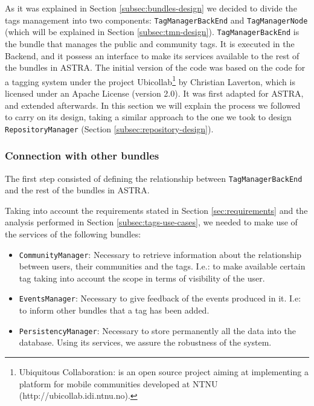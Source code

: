 As it was explained in Section \ref{subsec:bundles-design} we decided to divide
the tags management into two components: \verb|TagManagerBackEnd| and
\verb|TagManagerNode| (which will be explained in Section
\ref{subsec:tmn-design}).
\newline
\verb|TagManagerBackEnd| is the bundle that manages the public and community
tags. It is executed in the Backend, and it possess an interface to make its
services available to the rest of the bundles in ASTRA. 
The initial version of the code was based on the code for a tagging system under
the project Ubicollab\footnote{Ubiquitous Collaboration: is an open source
project aiming at implementing a platform for mobile communities developed at
NTNU (http://ubicollab.idi.ntnu.no).} by Christian Laverton, which is licensed
under an Apache License (version 2.0). It was first adapted for ASTRA, and 
extended afterwards.
\newline
In this section we will explain the process we followed to carry on its design, 
taking a similar approach to the one we took to design \verb|RepositoryManager|
(Section \ref{subsec:repository-design}).


\subsubsection{Connection with other bundles}
\label{subsubsec:connections-tmbe}

The first step consisted of defining the relationship between
\verb|TagManagerBackEnd| and the rest of the bundles in ASTRA.

Taking into account the requirements stated in Section \ref{sec:requirements}
and the analysis performed in Section \ref{subsec:tags-use-cases}, we needed to
make use of the services of the following bundles:

\begin{itemize}
  \item \verb|CommunityManager|: Necessary to retrieve information about the
  relationship between users, their communities and the tags. I.e.: to
  make available certain tag taking into account the scope in terms of 
  visibility of the user.
  \item \verb|EventsManager|: Necessary to give feedback of the events produced
  in it. I.e: to inform other bundles that a tag has been added.
  \item \verb|PersistencyManager|: Necessary to store permanently all the data
  into the database. Using its services, we assure the robustness of the system.
\end{itemize}

